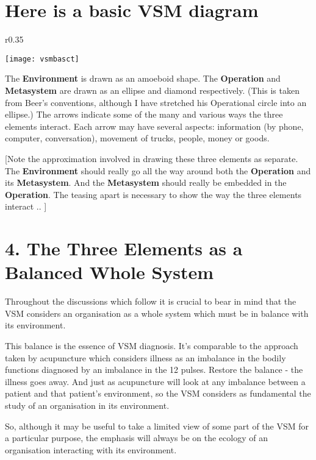 \section*{Here is a basic VSM diagram}
\begin{wrapfigure}{r}{0.35\textwidth}
\begin{center}
    \texttt{[image: vsmbasct]}
\end{center}
\end{wrapfigure}

The \textcolor{E}{\textbf{Environment}} is drawn as an amoeboid shape. The \textcolor{O}{\textbf{Operation}} and \textcolor{M}{\textbf{Metasystem}} are drawn as an ellipse and diamond respectively. (This is taken from Beer's conventions, although I have stretched his Operational circle into an ellipse.) The arrows indicate some of the many and various ways the three elements interact. Each arrow may have several aspects: information (by phone, computer, conversation), movement of trucks, people, money or goods.

{[}Note the approximation involved in drawing these three elements as separate. The \textcolor{E}{\textbf{Environment}} should really go all the way around both the \textcolor{O}{\textbf{Operation}} and its \textcolor{M}{\textbf{Metasystem}}. And the \textcolor{M}{\textbf{Metasystem}} should really be embedded in the \textcolor{O}{\textbf{Operation}}. The teasing apart is necessary to show the way the three elements interact .. {]}

\section*{4. The Three Elements as a Balanced Whole System}
Throughout the discussions which follow it is crucial to bear in mind that the VSM considers an organisation as a whole system which must be in balance with its environment.

This balance is the essence of VSM diagnosis. It's comparable to the approach taken by acupuncture which considers illness as an imbalance in the bodily functions diagnosed by an imbalance in the 12 pulses. Restore the balance - the illness goes away. And just as acupuncture will look at any imbalance between a patient and that patient's environment, so the VSM considers as fundamental the study of an organisation in its environment.

So, although it may be useful to take a limited view of some part of the VSM for a particular purpose, the emphasis will always be on the ecology of an organisation interacting with its environment.

